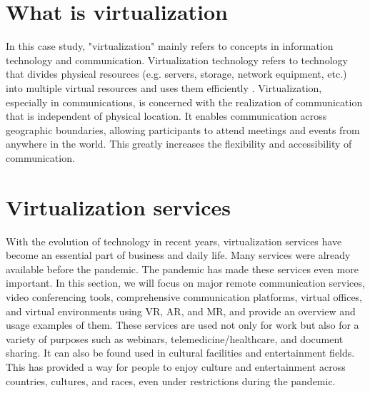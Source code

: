 \documentclass[12pt]{article}
\begin{document}
\section{What is virtualization}
In this case study, "virtualization" mainly refers to concepts in information
technology and communication. Virtualization technology refers to technology
that divides physical resources (e.g. servers, storage, network equipment,
etc.) into multiple virtual resources and uses them efficiently
\cite{virtualization_overview}.
Virtualization, especially in communications, is concerned with the realization
of communication that is independent of physical location. It enables
communication across geographic boundaries, allowing participants to attend
meetings and events from anywhere in the world. This greatly increases the
flexibility and accessibility of communication.

\newpage
\section{Virtualization services}
With the evolution of technology in recent years, virtualization services have
become an essential part of business and daily life. Many services were already
available before the pandemic. The pandemic has made these services even more
important. In this section, we will focus on major remote communication
services, video conferencing tools, comprehensive communication platforms,
virtual offices, and virtual environments using VR, AR, and MR, and provide an
overview and usage examples of them. These services are used not only for work
but also for a variety of purposes such as webinars, telemedicine/healthcare,
and document sharing. It can also be found used in cultural facilities and
entertainment fields. This has provided a way for people to enjoy culture and
entertainment across countries, cultures, and races, even under restrictions
during the pandemic.
\end{document}
